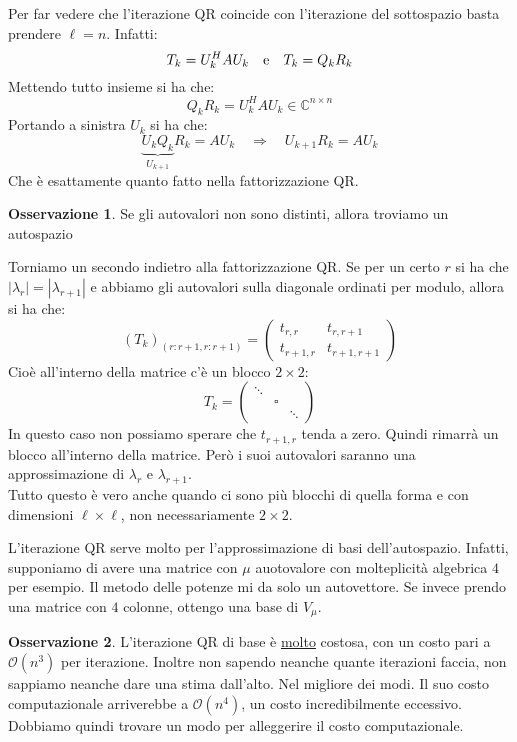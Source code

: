 \documentclass[11pt,a4paper,twoside]{article}
\theoremstyle{definition}
\newtheorem*{oss}{Osservazione}
\begin{document}
Per far vedere che l'iterazione QR coincide con l'iterazione del sottospazio basta prendere $\ell = n$. Infatti:
\[T_k = U_k^H AU_k \quad \text e \quad T_k = Q_k R_k\]
Mettendo tutto insieme si ha che:
\[Q_kR_k = U^H_k A U_k \in \mathbb C^{n \times n}\]
Portando a sinistra $U_k$ si ha che:
\[ \underbrace{U_kQ_k}_{U_{k+1}}R_k = AU_k \quad \Rightarrow \quad U_{k+1} R_k = AU_k \]
Che è esattamente quanto fatto nella fattorizzazione QR.

\begin{oss}
	Se gli autovalori non sono distinti, allora troviamo un autospazio
\end{oss}

Torniamo un secondo indietro alla fattorizzazione QR. Se per un certo $r$ si ha che $|\lambda_r| = |\lambda_{r+1}|$ e abbiamo gli autovalori sulla diagonale ordinati per modulo, allora si ha che:
\[ (T_k)_{(r:r+1, r:r+1)} = \begin{pmatrix} t_{r,r} & t_{r, r+1}\\ t_{r+1,r} & t_{r+1, r+1}\end{pmatrix} \]
Cioè all'interno della matrice c'è un blocco $2 \times 2$:
\[ T_k = \begin{pmatrix}\ddots \\ & \square\\ && \ddots\end{pmatrix}\]
In questo caso non possiamo sperare che $t_{r+1, r}$ tenda a zero. Quindi rimarrà un blocco all'interno della matrice. Però i suoi autovalori saranno una approssimazione di $\lambda_r$ e $\lambda_{r+1}$.\\
Tutto questo è vero anche quando ci sono più blocchi di quella forma e con dimensioni $\ell \times \ell$, non necessariamente $2 \times 2$.

L'iterazione QR serve molto per l'approssimazione di basi dell'autospazio. Infatti, supponiamo di avere una matrice con $\mu$ auotovalore con molteplicità algebrica $4$ per esempio. Il metodo delle potenze mi da solo un autovettore. Se invece prendo una matrice con $4$ colonne, ottengo una base di $V_\mu$.

\begin{oss}
	L'iterazione QR di base è \underline{molto} costosa, con un costo pari a $\mathcal O(n^3)$ per iterazione. Inoltre non sapendo neanche quante iterazioni faccia, non sappiamo neanche dare una stima dall'alto. Nel migliore dei modi. Il suo costo computazionale arriverebbe a $\mathcal O(n^4)$, un costo incredibilmente eccessivo. Dobbiamo quindi trovare un modo per alleggerire il costo computazionale.
\end{oss}
\end{document}
